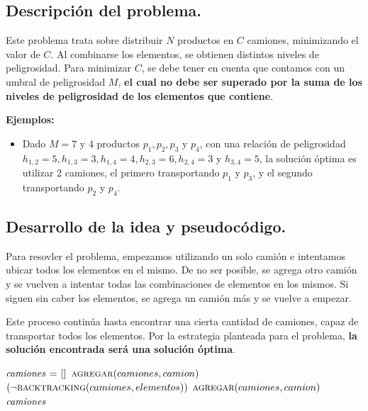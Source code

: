 \subsection{Descripción del problema.}

\vspace*{0.3cm}

Este problema trata sobre distribuir $N$ productos en $C$ camiones, minimizando
el valor de $C$. Al combinarse los elementos, se obtienen distintos niveles de peligrosidad.
Para minimizar $C$, se debe tener en cuenta que contamos con un umbral de peligrosidad
$M$, \textbf{el cual no debe ser superado por la suma de los niveles de peligrosidad de los
elementos que contiene}.

\vspace*{0.5cm}

\textbf{Ejemplos:}
\begin{itemize}
  \item Dado $M = 7$ y 4 productos $p_1, p_2, p_3$ y $p_4$, con una relación
  de peligrosidad $h_{1,2} = 5, h_{1,3} = 3, h_{1,4} = 4, h_{2,3} = 6, h_{2,4} =
  3$ y $h_{3,4} = 5$, la solución óptima es utilizar 2 camiones, el primero
  transportando $p_1$ y $p_3$, y el segundo transportando $p_2$ y $p_4$.
\end{itemize}



\subsection{Desarrollo de la idea y pseudocódigo.}

Para resovler el problema, empezamos utilizando un solo camión e intentamos ubicar 
todos los elementos en el mismo. De no ser posible, se agrega otro camión y se vuelven 
a intentar todas las combinaciones de elementos en los mismos. Si siguen sin caber los
elementos, se agrega un camión más y se vuelve a empezar.

Este proceso continúa hasta encontrar una cierta cantidad de camiones, capaz de 
transportar todos los elementos. Por la estrategia planteada para el problema, 
\textbf{la solución encontrada será una solución óptima}.

\vspace*{0.5cm}


\begin{codebox}
\li $\id{camiones} \gets []$
\li $\textnormal{\scshape agregar}(camiones, camion)$
\li \While $(\neg\textnormal{\scshape backtracking}(camiones, elementos))$
\li     \Do
            $\textnormal{\scshape agregar}(camiones, camion)$
        \End
\li \Return $\id{camiones}$
\end{codebox}


